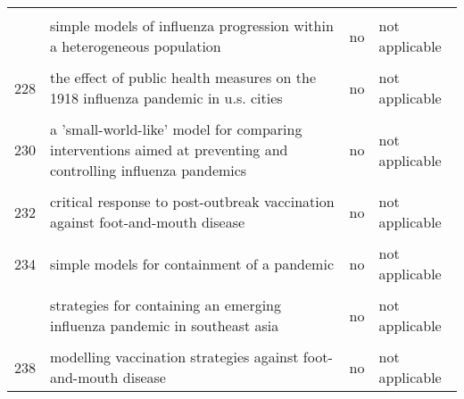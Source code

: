 \documentclass[
]{article}
\begin{document}
\begin{landscape}
\begin{longtable}{l>{\raggedright\arraybackslash}p{4cm}l>{\raggedright\arraybackslash}p{4cm}}
\cellcolor{gray!6}{225} & \cellcolor{gray!6}{effects of internal border control on spread of pandemic influenza} & \cellcolor{gray!6}{no} & \cellcolor{gray!6}{not applicable}\\
\addlinespace
226 & simple models of influenza progression within a heterogeneous population & no & not applicable\\
\cellcolor{gray!6}{227} & \cellcolor{gray!6}{stochastic model of an influenza epidemic with drug resistance} & \cellcolor{gray!6}{no} & \cellcolor{gray!6}{not applicable}\\
228 & the effect of public health measures on the 1918 influenza pandemic in u.s. cities & no & not applicable\\
\cellcolor{gray!6}{229} & \cellcolor{gray!6}{vaccinating in disease-free regions: a vaccine model with application to yellow fever} & \cellcolor{gray!6}{no} & \cellcolor{gray!6}{not applicable}\\
230 & a 'small-world-like' model for comparing interventions aimed at preventing and controlling influenza pandemics & no & not applicable\\
\addlinespace
\cellcolor{gray!6}{231} & \cellcolor{gray!6}{containing pandemic influenza with antiviral agents: analytical commentary} & \cellcolor{gray!6}{yes} & \cellcolor{gray!6}{no}\\
232 & critical response to post-outbreak vaccination against foot-and-mouth disease & no & not applicable\\
\cellcolor{gray!6}{233} & \cellcolor{gray!6}{mitigation strategies for pandemic influenza in the united states} & \cellcolor{gray!6}{yes} & \cellcolor{gray!6}{yes}\\
234 & simple models for containment of a pandemic & no & not applicable\\
\cellcolor{gray!6}{235} & \cellcolor{gray!6}{statistical inference in a stochastic epidemic seir model with control intervention: ebola as a case study} & \cellcolor{gray!6}{no} & \cellcolor{gray!6}{not applicable}\\
\addlinespace
236 & strategies for containing an emerging influenza pandemic in southeast asia & no & not applicable\\
\cellcolor{gray!6}{237} & \cellcolor{gray!6}{modeling alternative mitigation strategies for a hypothetical outbreak of foot-and-mouth disease in the united states} & \cellcolor{gray!6}{yes} & \cellcolor{gray!6}{inconclusive}\\
238 & modelling vaccination strategies against foot-and-mouth disease & no & not applicable\\

\end{longtable}
\end{landscape}
\end{document}
